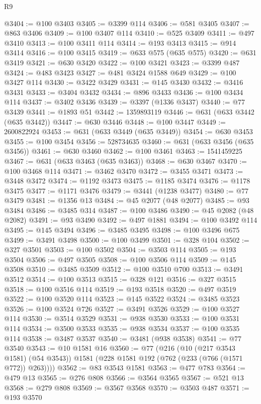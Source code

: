 \begin{lexlean}{R9}
\begin{coremodule}
@3404 := @100 @3403
@3405 := @3399 @114
@3406 := @581 @3405
@3407 := @863 @3406
@3409 := @100 @3407 @114
@3410 := @525 @3409
@3411 := @497 @3410
@3413 := @100 @3411 @114
@3414 := @193 @3413
@3415 := @914 @3414
@3416 := @100 @3415
@3419 := @633 @575 (@635 @575)
@3420 := @631 @3419
@3421 := @630 @3420
@3422 := @100 @3421
@3423 := @3399 @487
@3424 := @483 @3423
@3427 := @481 @3424 @1588 @649
@3429 := @100 @3427 @114
@3430 := @3422 @3429
@3431 := @145 @3430
@3432 := @3416 @3431
@3433 := @3404 @3432
@3434 := @896 @3433
@3436 := @100 @3434 @114
@3437 := @3402 @3436
@3439 := @3397 (@1336 @3437)
@3440 := @77 @3439
@3441 := @1893 @51
@3442 := 1359893119
@3446 := @631 (@633 @3442 (@635 @3442))
@3447 := @630 @3446
@3448 := @100 @3447
@3449 := 2600822924
@3453 := @631 (@633 @3449 (@635 @3449))
@3454 := @630 @3453
@3455 := @100 @3454
@3456 := 528734635
@3460 := @631 (@633 @3456 (@635 @3456))
@3461 := @630 @3460
@3462 := @100 @3461
@3463 := 1541459225
@3467 := @631 (@633 @3463 (@635 @3463))
@3468 := @630 @3467
@3470 := @100 @3468 @114
@3471 := @3462 @3470
@3472 := @3455 @3471
@3473 := @3448 @3472
@3474 := @1192 @3473
@3475 := @1185 @3474
@3476 := @1178 @3475
@3477 := @1171 @3476
@3479 := @3441 (@1238 @3477)
@3480 := @77 @3479
@3481 := @1356 @13
@3484 := @45 @2077 (@48 @2077)
@3485 := @93 @3484
@3486 := @3485 @314
@3487 := @100 @3486
@3490 := @45 @2082 (@48 @2082)
@3491 := @93 @3490
@3492 := @497 @1881
@3494 := @100 @3492 @114
@3495 := @145 @3494
@3496 := @3485 @3495
@3498 := @100 @3496 @675
@3499 := @3491 @3498
@3500 := @100 @3499
@3501 := @328 @104
@3502 := @327 @3501
@3503 := @100 @3502
@3504 := @3503 @114
@3505 := @193 @3504
@3506 := @497 @3505
@3508 := @100 @3506 @114
@3509 := @145 @3508
@3510 := @3485 @3509
@3512 := @100 @3510 @700
@3513 := @3491 @3512
@3514 := @100 @3513
@3515 := @328 @121
@3516 := @327 @3515
@3518 := @100 @3516 @114
@3519 := @193 @3518
@3520 := @497 @3519
@3522 := @100 @3520 @114
@3523 := @145 @3522
@3524 := @3485 @3523
@3526 := @100 @3524 @726
@3527 := @3491 @3526
@3529 := @100 @3527 @114
@3530 := @3514 @3529
@3531 := @938 @3530
@3533 := @100 @3531 @114
@3534 := @3500 @3533
@3535 := @938 @3534
@3537 := @100 @3535 @114
@3538 := @3487 @3537
@3540 := @3481 (@938 @3538)
@3541 := @77 @3540
@3543 := @10 @1581 @16
@3560 := @77
    (@216
      (@10 (@217 @3543 @1581) (@54 @3543))
      @1581
      (@228 @1581 @192 (@762 (@233 (@766 (@1571 @772)) @263))))
@3562 := @83 @3543 @1581
@3563 := @477 @783
@3564 := @479 @13
@3565 := @276 @808
@3566 := @3564 @3565
@3567 := @521 @13
@3568 := @279 @808
@3569 := @3567 @3568
@3570 := @3503 @487
@3571 := @193 @3570

\end{coremodule}
\end{lexlean}
